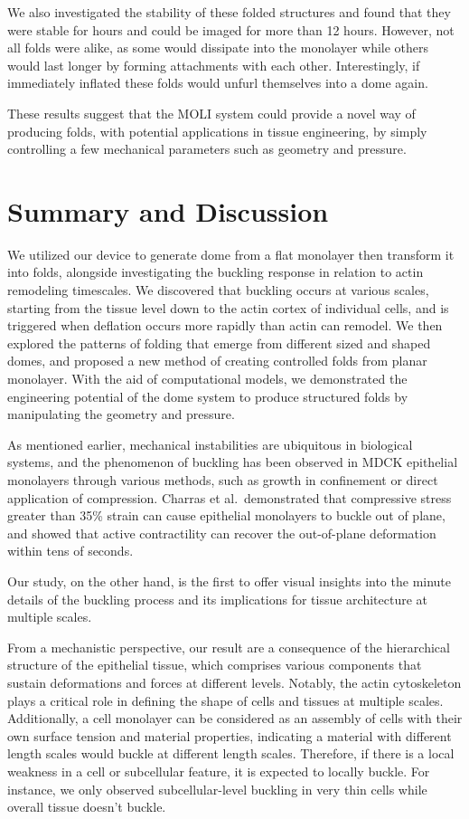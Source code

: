 We also investigated the stability of these folded structures and found
that they were stable for hours and could be imaged for more than 12
hours. However, not all folds were alike, as some would dissipate into
the monolayer while others would last longer by forming attachments with
each other. Interestingly, if immediately inflated these folds would
unfurl themselves into a dome again.

These results suggest that the MOLI system could provide a novel way of
producing folds, with potential applications in tissue engineering, by
simply controlling a few mechanical parameters such as geometry and
pressure.

\hypertarget{summary-and-discussion-1}{%
	\section{Summary and Discussion}\label{summary-and-discussion-1}}

We utilized our device to generate dome from a flat monolayer then
transform it into folds, alongside investigating the buckling response
in relation to actin remodeling timescales. We discovered that buckling
occurs at various scales, starting from the tissue level down to the
actin cortex of individual cells, and is triggered when deflation occurs
more rapidly than actin can remodel. We then explored the patterns of
folding that emerge from different sized and shaped domes, and proposed
a new method of creating controlled folds from planar monolayer. With
the aid of computational models, we demonstrated the engineering
potential of the dome system to produce structured folds by manipulating
the geometry and pressure.

As mentioned earlier, mechanical instabilities are ubiquitous in
biological systems, and the phenomenon of buckling has been observed in
MDCK epithelial monolayers through various methods, such as growth in
confinement or direct application of compression. Charras et
al.~demonstrated that compressive stress greater than 35\% strain can
cause epithelial monolayers to buckle out of plane, and showed that
active contractility can recover the out-of-plane deformation within
tens of seconds.

Our study, on the other hand, is the first to offer visual insights into
the minute details of the buckling process and its implications for
tissue architecture at multiple scales.

From a mechanistic perspective, our result are a consequence of the
hierarchical structure of the epithelial tissue, which comprises various
components that sustain deformations and forces at different levels.
Notably, the actin cytoskeleton plays a critical role in defining the
shape of cells and tissues at multiple scales. Additionally, a cell
monolayer can be considered as an assembly of cells with their own
surface tension and material properties, indicating a material with
different length scales would buckle at different length scales.
Therefore, if there is a local weakness in a cell or subcellular
feature, it is expected to locally buckle. For instance, we only
observed subcellular-level buckling in very thin cells while overall
tissue doesn't buckle.

